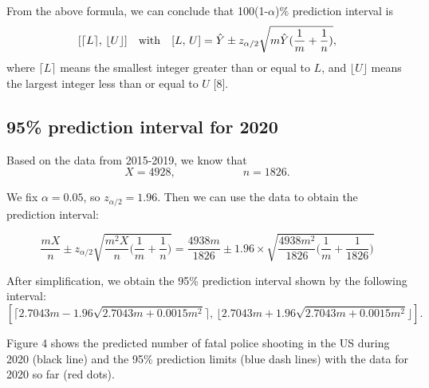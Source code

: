 \documentclass[a4paper]{article}
\begin{document}
	From the above formula, we can conclude that 100(1-$\alpha$)\% prediction interval is $$[\lceil L\rceil,\,\lfloor U\rfloor]\quad {\rm with}\quad [L,\, U]=\hat{Y}\pm z_{\alpha/2}\sqrt{m\hat{Y}(\frac{1}{m}+\frac{1}{n})},$$ where $\lceil L\rceil$ means the smallest integer greater than or equal to $L$, and $\lfloor U\rfloor$ means the  largest integer less than or equal to $U$ [8].

\subsection{95\% prediction interval for 2020}
	Based on the data from 2015-2019, we know that $$X=4928,\qquad\qquad\qquad n=1826.$$
	
	We fix $\alpha=0.05$, so $z_{\alpha /2}=1.96$. Then we can use the data to obtain the prediction interval:
	
	$$\frac{mX}{n}\pm z_{\alpha /2}\sqrt{\frac{m^2X}{n}\bigg(\frac{1}{m}+\frac{1}{n}\bigg)}=\frac{4938m}{1826}\pm1.96\times\sqrt{\frac{4938m^2}{1826}\bigg(\frac{1}{m}+\frac{1}{1826}\bigg)}$$
	
	After simplification, we obtain the 95\% prediction interval shown by the following interval: $$[\lceil2.7043m-1.96\sqrt{2.7043m+0.0015m^2}\rceil,\, \lfloor2.7043m+1.96\sqrt{2.7043m+0.0015m^2}\rfloor].$$
	

	Figure 4 shows the predicted number of fatal police shooting in the US during 2020 (black line) and the 95\% prediction limits (blue dash lines) with the data for 2020 so far (red dots).
	
\end{document}
